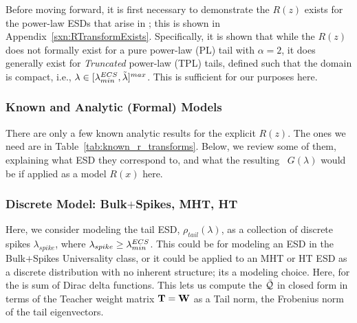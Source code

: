 
Before moving forward, it is first necessary to demonstrate the \RTransform $R(z)$ exists for the power-law ESDs that arise in \SETOL; this is shown in Appendix~\ref{sxn:RTransformExists}.  Specifically, it is shown that while the $R(z)$ does not formally exist for a pure power-law (PL) tail with $\alpha=2$, it does generally exist for \emph{Truncated} power-law (TPL) tails, defined such that the domain is compact, i.e., $\lambda\in[\lambda^{ECS}_{min}, \tilde{\lambda}]^{max}$.  This is sufficient for our purposes here.

\subsubsection{Known \RTransforms and Analytic (Formal) Models}
\label{sxn:r_transforms:known_r_transforms}

There are only a few known analytic results for the explicit \RTransform $R(z)$.
The ones we need are in Table~\ref{tab:known_r_transforms}.
Below, we review some of them, explaining what ESD they correspond to,
and what the resulting \GEN~$G(\lambda)$ would be if applied
as a model $R(x)$ here.



\subsubsection{Discrete Model: Bulk\texorpdfstring{$+$}{+}Spikes, MHT, HT}

Here, we consider modeling the tail ESD, $\rho_{tail}(\lambda)$, as a collection
of discrete spikes $\lambda_{spike}$, 
where $\lambda_{spike}\ge \lambda^{ECS}_{min}$.
This could be for modeling an ESD in the Bulk$+$Spikes \HTSR Universality class,
or it could be applied to an MHT or HT ESD as a discrete distribution with
no inherent structure; its a modeling choice.
Here, \RTransform for the \ECS is sum of Dirac delta functions.
This lets us compute the \LayerQuality $\bar{\mathcal{Q}}$ in closed form in terms of the Teacher weight matrix
${\mathbf{T}}={\mathbf{W}}$ as a Tail norm, the Frobenius norm of the tail eigenvectors.


